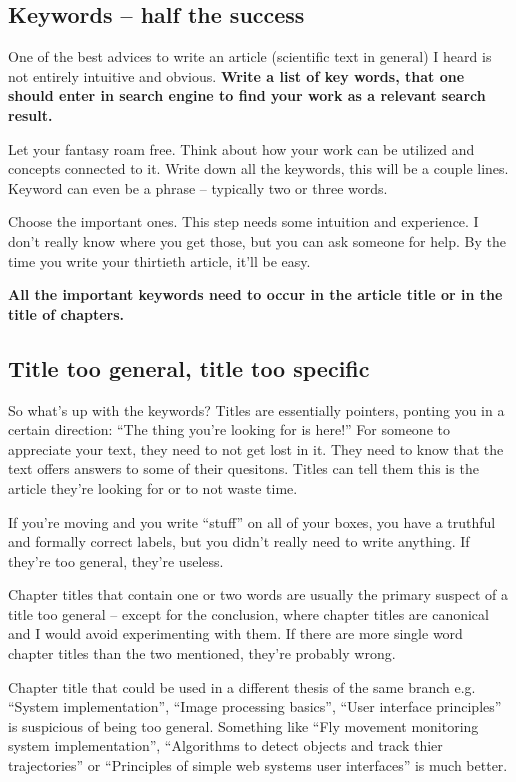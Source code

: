 {{\subsection*{Keywords -- half the success}

One of the best advices to write an article (scientific text in general) I heard is not entirely intuitive and obvious.
\bf Write a list of key words, that one should enter in search engine to find your work as a relevant search result. \rm

Let your fantasy roam free. Think about how your work can be utilized and concepts connected to it. Write down all the keywords, this will be a couple lines. Keyword can even be a phrase -- typically two or three words.

Choose the important ones. This step needs some intuition and experience. I don't really know where you get those, but you can ask someone for help. By the time you write your thirtieth article, it'll be easy.

\bf All the important keywords need to occur in the article title or in the title of chapters. \rm

\subsection*{Title too general, title too specific}

So what's up with the keywords? Titles are essentially pointers, ponting you in a certain direction: ``The thing you're looking for is here!'' For someone to appreciate your text, they need to not get lost in it. They need to know that the text offers answers to some of their quesitons. Titles can tell them this is the article they're looking for or to not waste time.

If you're moving and you write ``stuff'' on all of your boxes, you have a truthful and formally correct labels, but you didn't really need to write anything. If they're too general, they're useless.

Chapter titles that contain one or two words are usually the primary suspect of a title too general -- except for the conclusion, where chapter titles are canonical and I would avoid experimenting with them. If there are more single word chapter titles than the two mentioned, they're probably wrong.

Chapter title that could be used in a different thesis of the same branch e.g. ``System implementation'', ``Image processing basics'', ``User interface principles'' is suspicious of being too general. Something like ``Fly movement monitoring system implementation'', ``Algorithms to detect objects and track thier trajectories'' or ``Principles of simple web systems user interfaces'' is much better.

}}
